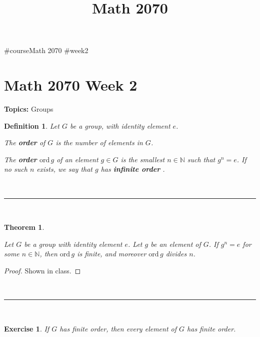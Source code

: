 \documentclass[a4paper,12pt]{report}
\newcommand{\ord}{\mathrm{ord}\,}
\renewcommand{\ord}{\mathrm{ord}\,}
\newcounter{statement}
\numberwithin{statement}{chapter}
\newtheorem{thm}[statement]{Theorem}
\newtheorem{defn}[statement]{Definition}
\newtheorem{ex}[statement]{\bf Exercise}
\numberwithin{equation}{chapter}
\numberwithin{section}{chapter}
\numberwithin{subsection}{section}
\begin{document}
#course{Math 2070}
#week{2}
\title{Math 2070}
\setcounter{chapter}{2}\setcounter{section}{0}
\setcounter{subsection}{0}
\setcounter{statement}{0}

\chapter*{Math 2070 Week 2}
{\bf Topics: }Groups


\begin{defn}
Let $G$ be a group, with identity element $e$.



The  {\bf order}  of $G$ is the number of elements in $G$.



The  {\bf order}  $\ord g$ of an  element $g \in G$
is the smallest $n \in \mathbb{N}$ such that $g^n = e$.
If no such $n$ exists, we say that $g$ has  {\bf infinite order} .
\end{defn}




\quad\\\hrule
\quad\\

\begin{thm}
\label{thm:orderdividesn}



Let $G$ be a group with identity element $e$.
Let $g$ be an element of $G$.  If $g^n = e$ for some $n \in \mathbb{N}$,
then $\ord g$ is finite, and moreover $\ord g$ divides $n$.
\end{thm}
\begin{proof}
Shown in class.
\end{proof}

\quad\\\hrule
\quad\\




\begin{ex}

If $G$ has finite order, then every element of $G$ has finite order.

\end{ex}
\end{document}
